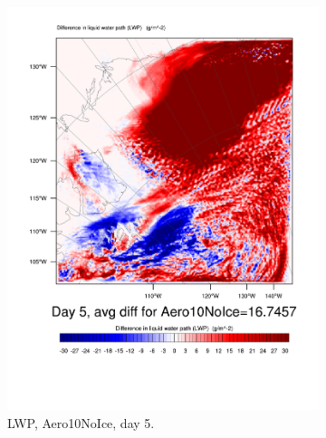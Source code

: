 \begin{figure}[hb]
\centering
	\begin{subfigure}{0.48\textwidth}
		\centering
		\includegraphics[width=\textwidth]{results/aero10ni/Diff_LWP_Day5Aero10NoIce.pdf}
		\caption{LWP, Aero10NoIce, day 5.}
		\label{subfig:LWPr4Day5}
	\end{subfigure}
	\quad
	\begin{subfigure}{0.48\textwidth}
		\centering

\end{subfigure}
\end{figure}

